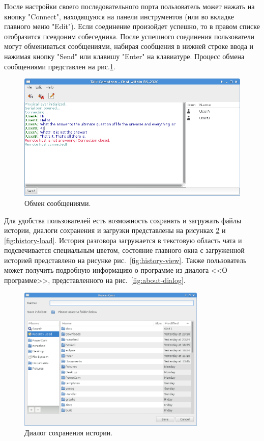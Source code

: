 \documentclass[russian,utf8,simple,emptystyle]{eskdtext}
\begin{document}
После настройки своего последовательного порта пользователь может нажать на кнопку "Connect", находящуюся на панели инструментов (или во вкладке главного меню "Edit"). Если соединение произойдет успешно, то в правом списке отобразится псевдоним собеседника. После успешного соединения пользователи могут обмениваться сообщениями, набирая сообщения в нижней строке ввода и нажимая кнопку "Send" или клавишу "Enter" на клавиатуре. Процесс обмена сообщениями представлен на рис.\ref{fig:main-window2}.

\begin{figure}[!h]
\centering
\includegraphics[scale=0.6]{main_window2}
\caption{Обмен сообщениями.}
\label{fig:main-window2}
\end{figure}

Для удобства пользователей есть возможность сохранять и загружать файлы истории, диалоги сохранения и загрузки представлены на рисунках \ref{fig:history-save} и \ref{fig:history-load}. История разговора загружается в текстовую область чата и подсвечивается специальным цветом, состояние главного окна с загруженной историей представлено на рисунке рис.~\ref{fig:history-view}. Также пользователь может получить подробную информацию о программе из диалога <<О программе>>, представленного на рис.~\ref{fig:about-dialog}.

\begin{figure}[!h]
\centering
\includegraphics[width=0.8\textwidth]{history_save}
\caption{Диалог сохранения истории.}
\label{fig:history-save}
\end{figure}
\end{document}
